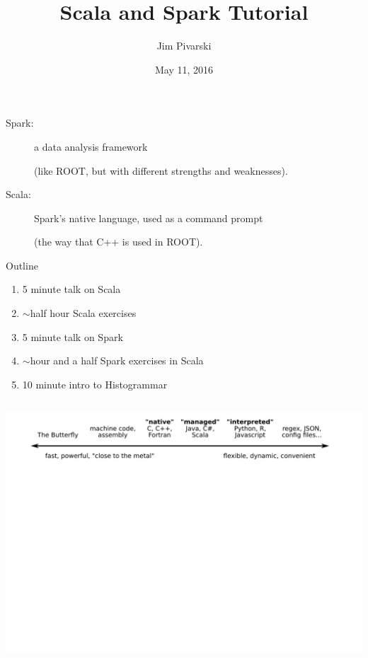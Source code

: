 \documentclass{beamer}
\title[2016-05-11-scala-spark]{Scala and Spark Tutorial}
\author{Jim Pivarski}
\institute{Princeton University -- DIANA}
\date{May 11, 2016}
\begin{document}
\begin{frame}
  \titlepage
\end{frame}


\begin{frame}{}
\begin{description}
\item[Spark:] a data analysis framework

{\small (like ROOT, but with different strengths and weaknesses).}

\vspace{0.5 cm}

\item[Scala:] Spark's native language, used as a command prompt

{\small (the way that C++ is used in ROOT).}
\end{description}
\end{frame}

\begin{frame}{Outline}
\begin{enumerate}
\item 5 minute talk on Scala
\item $\sim$half hour Scala exercises
\item 5 minute talk on Spark
\item $\sim$hour and a half Spark exercises in Scala
\item 10 minute intro to Histogrammar
\end{enumerate}
\end{frame}

\begin{frame}{}
\begin{columns}
\includegraphics[width=\linewidth]{languages1.pdf}
\end{columns}
\end{frame}
\end{document}
